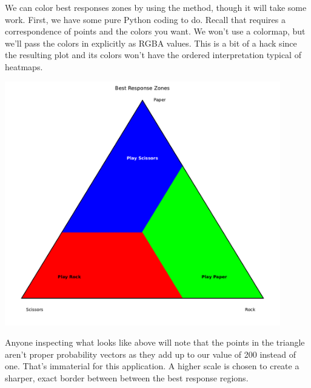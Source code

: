 We can color best responses zones by using the  method, though it will take some work. First, we have some pure Python coding to do. Recall that  requires a correspondence of points and the colors you want. We won't use a colormap, but we'll pass the colors in explicitly as RGBA values. This is a bit of a hack since the resulting plot and its colors won't have the ordered interpretation typical of heatmaps. 



\begin{center}
    \includegraphics[width = 0.90\textwidth]{figures/specialplots/rps-br-zones.pdf}
\end{center}

Anyone inspecting what  looks like above will note that the points in the triangle aren't proper probability vectors as they add up to our  value of 200 instead of one. That's immaterial for this application. A higher scale is chosen to create a sharper, exact border between between the best response regions. 